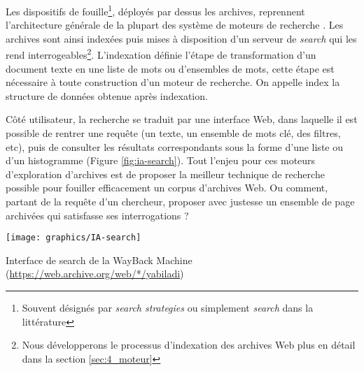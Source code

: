 \documentclass[symmetric,justified,marginals=raggedouter]{tufte-book}
\begin{document}
Les dispositifs de fouille\footnote{Souvent désignés par \textit{search strategies} ou simplement \textit{search} dans la littérature}, déployés par dessus les archives, reprennent l'architecture générale de la plupart des système de moteurs de recherche \citep{grainger_solr_2014,hatcher_lucene_2004}. Les archives sont ainsi indexées puis mises à disposition d'un serveur de \textit{search} qui les rend interrogeables\footnote{Nous développerons le processus d'indexation des archives Web plus en détail dans la section \ref{sec:4_moteur}}. L'indexation définie l'étape de transformation d'un document texte en une liste de mots ou d'ensembles de mots, cette étape est nécessaire à toute construction d'un moteur de recherche. On appelle index la structure de données obtenue après indexation. 

Côté utilisateur, la recherche se traduit par une interface Web, dans laquelle il est possible de rentrer une requête (un texte, un ensemble de mots clé, des filtres, etc), puis de consulter les résultats correspondants sous la forme d'une liste ou d'un histogramme (Figure \ref{fig:ia-search}). Tout l'enjeu pour ces moteurs d'exploration d'archives est de proposer la meilleur technique de recherche possible pour fouiller efficacement un corpus d'archives Web. Ou comment, partant de la requête d'un chercheur, proposer avec justesse un ensemble de page archivées qui satisfasse ses interrogations ?

\begin{marginfigure}%
  \texttt{[image: graphics/IA-search]}
  \caption{Interface de search de la WayBack Machine (\url{https://web.archive.org/web/*/yabiladi})}
  \label{fig:ia-search}
\end{marginfigure} 
\end{document}
